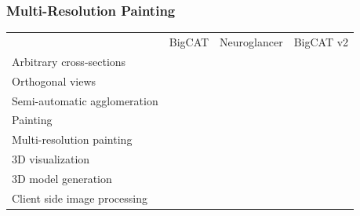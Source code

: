 \documentclass[aspectratio=169,table]{beamer}
\newcommand{\cmark}{\ding{51}}%
\newcommand{\xmark}{\ding{55}}%
\newcommand{\gcmark}{{\color{green}\cmark}}%
\newcommand{\ycmark}{{\color{yellow}\cmark}}%
\newcommand{\rxmark}{{\color{red}\xmark}}%
\begin{document}
\begin{frame}
    \frametitle{Multi-Resolution Painting}
    \small
    \vspace{1cm}
    \begin{table}
        \centering
        \begin{tabular}{lccc}
                                                            & BigCAT & Neuroglancer & BigCAT v2 \\
          Arbitrary cross-sections                          & \gcmark & \gcmark & \gcmark \\
          Orthogonal views                                  & \rxmark & \gcmark & \gcmark \\
          Semi-automatic agglomeration                      & \gcmark & \rxmark & \gcmark \\
          \rowcolor{black!20} Painting                      & \gcmark & \rxmark & \gcmark \\
          \rowcolor{black!20} Multi-resolution painting     & \rxmark & \rxmark & \gcmark \\
          3D visualization                                  & \rxmark & \gcmark & \gcmark \\
          3D model generation                               & \rxmark & \rxmark & \gcmark \\
          Client side image processing                      & \gcmark & \ycmark & \gcmark \\
        \end{tabular}
    \end{table}
\end{frame}
\end{document}
